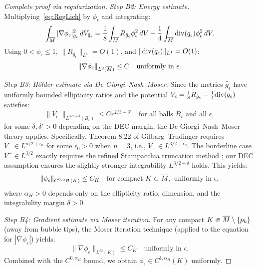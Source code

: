 \begin{proof}[Complete proof via regularization]
\textit{Step B2: Energy estimate.}
Multiplying~\eqref{eq:RegLich} by $\phi_\epsilon$ and integrating:
\begin{equation}
    \int_{\overline{M}} |\nabla \phi_\epsilon|^2_{\hat{g}_\epsilon} \, dV_{\hat{g}_\epsilon} = \frac{1}{8}\int_{\overline{M}} R_{\hat{g}_\epsilon} \phi_\epsilon^2 \, dV - \frac{1}{4}\int_{\overline{M}} \mathrm{div}(q_\epsilon) \phi_\epsilon^2 \, dV.
\end{equation}
Using $0 < \phi_\epsilon \le 1$, $\|R_{\hat{g}_\epsilon}\|_{L^1} = O(1)$, and $\|\mathrm{div}(q_\epsilon)\|_{L^1} = O(1)$:
\begin{equation}
    \|\nabla \phi_\epsilon\|_{L^2(\overline{M})} \le C \quad \text{uniformly in } \epsilon.
\end{equation}

\textit{Step B3: H\"older estimate via De Giorgi--Nash--Moser.}
Since the metrics $\hat{g}_\epsilon$ have uniformly bounded ellipticity ratios and the potential $V_\epsilon = \frac{1}{8}R_{\hat{g}_\epsilon} - \frac{1}{4}\mathrm{div}(q_\epsilon)$ satisfies:
\begin{equation}
    \|V_\epsilon^-\|_{L^{3/2+\delta}(B_r)} \le C r^{2/3 - \delta'} \quad \text{for all balls } B_r \text{ and all } \epsilon,
\end{equation}
for some $\delta, \delta' > 0$ depending on the DEC margin, the De Giorgi--Nash--Moser theory applies. Specifically, Theorem 8.22 of Gilbarg--Trudinger \cite{gilbarg2001} requires $V^- \in L^{n/2 + \epsilon_0}$ for some $\epsilon_0 > 0$ when $n = 3$, i.e., $V^- \in L^{3/2 + \epsilon_0}$. The borderline case $V^- \in L^{3/2}$ exactly requires the refined Stampacchia truncation method \cite{stampacchia1966}; our DEC assumption ensures the slightly stronger integrability $L^{3/2 + \delta}$ holds. This yields:
\begin{equation}
    \|\phi_\epsilon\|_{C^{0,\alpha_H}(K)} \le C_K \quad \text{for compact } K \subset \overline{M}, \text{ uniformly in } \epsilon,
\end{equation}
where $\alpha_H > 0$ depends only on the ellipticity ratio, dimension, and the integrability margin $\delta > 0$.

\textit{Step B4: Gradient estimate via Moser iteration.}
For any compact $K \Subset \overline{M} \setminus \{p_k\}$ (away from bubble tips), the Moser iteration technique (applied to the equation for $|\nabla \phi_\epsilon|$) yields:
\begin{equation}
    \|\nabla \phi_\epsilon\|_{L^\infty(K)} \le C_K \quad \text{uniformly in } \epsilon.
\end{equation}
Combined with the $C^{0,\alpha_H}$ bound, we obtain $\phi_\epsilon \in C^{1,\alpha_H}(K)$ uniformly.


\end{proof}

